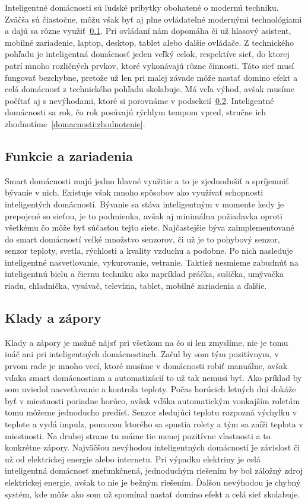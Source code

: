\documentclass[10pt,twoside,slovak,a4paper]{article}
\begin{document}
Inteligentné domácnosti sú ľudské príbytky obohatené o modernú techniku. Zväčša sú čiastočne, môžu však byť aj plne ovládateľné modernými technológiami a dajú sa rôzne využiť~\ref{domacnosti:využitie}. Pri ovládaní nám dopomáha či už hlasový asistent, mobilné zariadenie, laptop, desktop, tablet alebo dalšie ovládače. Z technického pohľadu je inteligentná domácnosť jeden veľký celok, respektíve sieť, do ktorej patrí mnoho rozličných prvkov, ktoré vykonávajú rôzne činnosti. Táto sieť musí fungovať bezchybne, pretože už len pri malej závade môže nastať domino efekt a celá domácnosť z technického pohľadu skolabuje. Má veľa výhod, avšak musíme počítať aj s nevýhodami, ktoré si porovnáme v podsekcií~\ref{domacnosti:plusy}. Inteligentné domácnosti sa rok, čo rok posúvajú rýchlym tempom vpred, stručne ich zhodnotíme~\ref{domacnosti:zhodnotenie}.

\subsection{Funkcie a zariadenia}\label{domacnosti:využitie}

Smart domácnosti majú jedno hlavné využitie a to je zjednodušiť a spríjemniť bývanie v nich. Existuje však mnoho spôsobov ako využívať schopnosti inteligentých domácností. Bývanie sa stáva inteligentným v momente kedy je prepojené so sieťou, je to podmienka, avšak aj minimálna požiadavka oproti všetkému čo môže byť súčasťou tejto siete. Najčastejšie býva zaimplementované do smart domácností veľké množstvo senzorov, či už je to pohybový senzor, senzor teploty, svetla, rýchlosti a kvality vzduchu a podobne.  Po nich nasleduje inteligentné nasvetlovanie, vykurovanie, vetranie. Taktiež nesmieme zabudnúť na inteligentnú bielu a čiernu techniku ako napríklad práčka, sušička, umývačka riadu, chladnička, vysávač, televízia, tablet, mobilné zariadenia a ďalšie. 

\subsection{Klady a zápory}\label{domacnosti:plusy}

Klady a zápory je možné nájsť pri všetkom na čo si len zmyslíme, nie je tomu ináč ani pri inteligentných domácnostiach. Začal by som tým pozitívnym, v prvom rade je mnoho vecí, ktoré musíme v domácnosti robiť manuálne, avšak vďaka smart domácnostiam a automatizácií to už tak nemusí byť. Ako príklad by som uviedol nasvetlovanie a kontrola teploty. Počas horúcich letných dní dokáže byť v miestnosti poriadne horúco, avšak vďáka automatickým vonkajším roletám tomu môžeme jednoducho predísť. Senzor sledujúci teplotu rozpozná výchylku v teplote a vydá impulz, pomocou ktorého sa spustia rolety a tým sa zníži teplota v miestnosti. Na druhej strane tu máme tie menej pozitívne vlastnosti a to konkrétne zápory. Najväčšou nevýhodou inteligentných domácností je závislosť či už od elektrickej energie alebo internetu. Pri výpadku elektriny je celá inteligentná domácnosť znefunkčnená, jednoduchým riešením by bol záložný zdroj elektrickej energie, avšak to nie je bežným riešením. Ďalšou nevýhodou je chybný systém, kde môže ako som už spomínal nastať domino efekt a celá sieť skolabuje.
\end{document}
